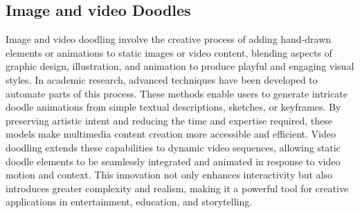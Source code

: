 \subsection{Image and video Doodles}


Image and video doodling involve the creative process of adding hand-drawn elements or animations to static images or video content, blending aspects of graphic design, illustration, and animation to produce playful and engaging visual styles. In academic research, advanced techniques\cite{yu2023designing,videodoodles,belova2021google} have been developed to automate parts of this process. These methods enable users to generate intricate doodle animations from simple textual descriptions, sketches, or keyframes. By preserving artistic intent and reducing the time and expertise required, these models make multimedia content creation more accessible and efficient. Video doodling extends these capabilities to dynamic video sequences, allowing static doodle elements to be seamlessly integrated and animated in response to video motion and context. This innovation not only enhances interactivity but also introduces greater complexity and realism, making it a powerful tool for creative applications in entertainment, education, and storytelling.


